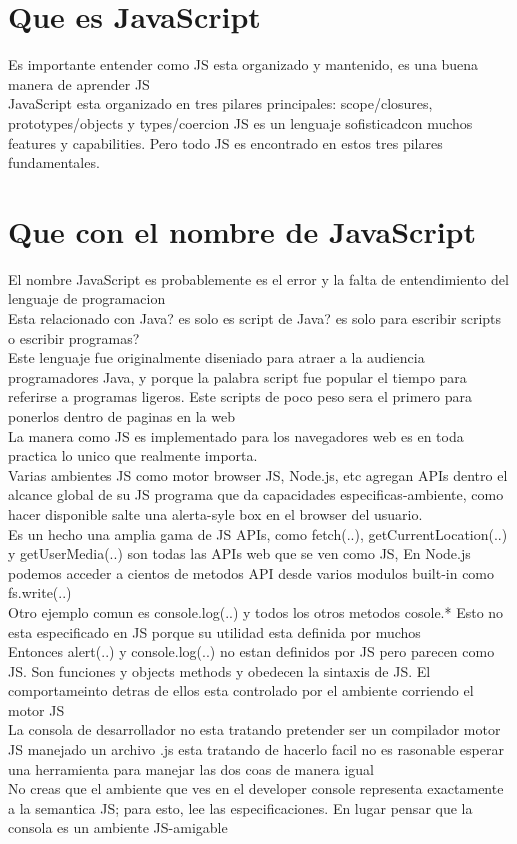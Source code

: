 \chapter{Que es JavaScript}
Es importante entender como JS esta organizado y mantenido, es una buena manera de aprender JS \\
JavaScript esta organizado en tres pilares principales: scope/closures, prototypes/objects y types/coercion JS es un lenguaje sofisticadcon muchos features y capabilities. Pero todo JS es encontrado en estos tres pilares fundamentales.
\chapter{Que con el nombre de JavaScript}
El nombre JavaScript es probablemente es el error y la falta de entendimiento del lenguaje de programacion\\ Esta relacionado con Java? es solo es script de Java? es solo para escribir scripts o escribir programas?\\
Este lenguaje fue originalmente diseniado para atraer a la audiencia programadores Java, y porque la palabra script fue popular el tiempo para referirse a programas ligeros. Este scripts de poco peso sera el primero para ponerlos dentro de paginas en la web\\
La manera como JS es implementado para los navegadores web es en toda practica lo unico que realmente importa.\\
Varias ambientes JS  como motor browser JS, Node.js, etc agregan APIs dentro el alcance global de su JS programa que da capacidades especificas-ambiente, como hacer disponible salte una alerta-syle box en el browser del usuario.\\
Es un hecho una amplia gama de JS APIs, como fetch(..), getCurrentLocation(..) y getUserMedia(..) son todas las APIs web que se ven como JS, En Node.js podemos acceder a cientos de metodos API desde varios modulos built-in  como fs.write(..)\\
Otro ejemplo comun es console.log(..) y todos los otros metodos cosole.* Esto no esta especificado en JS porque su utilidad esta definida por muchos \\
Entonces alert(..) y console.log(..) no estan definidos por JS pero parecen como JS. Son funciones y objects methods y obedecen la sintaxis de JS. El comportameinto detras de ellos esta controlado por el ambiente corriendo el motor JS\\
La consola de desarrollador no esta tratando pretender ser un compilador motor JS manejado un archivo .js esta tratando de hacerlo facil no es rasonable esperar una herramienta para manejar las dos coas de manera igual\\
No creas que el ambiente que ves en el developer console representa exactamente a la semantica JS; para esto, lee las especificaciones. En lugar pensar que la consola es un ambiente JS-amigable 
